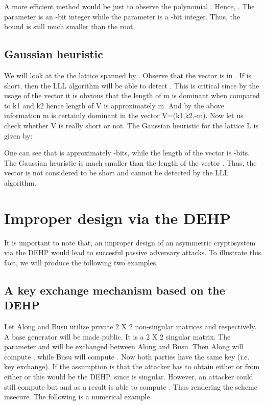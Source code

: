 \documentclass{llncs}
\begin{document}
\begin{case}
A more efficient method would be just to observe the polynomial
. Hence, . The parameter  is an -bit
integer while the parameter  is a -bit integer. Thus,
the bound is still much smaller than the root.
\end{case}

\subsection{Gaussian heuristic}
We will look at the the lattice  spanned by . Observe that the vector  is
in . If  is short, then the LLL algorithm will be able to
detect . This is critical since by the usage of the vector
 it is obvious that the length of m is dominant when
compared to k1 and k2 hence length of V is approximately m. And by
the above information m is certainly dominant in the vector
V=(k1,k2,-m). Now let us check whether V is really short or not.
The Gaussian heuristic for the lattice L is given by:

One can see that  is approximately -bits,
while the length of the vector  is -bits. The
Gaussian heuristic is much smaller than the length of the vector .
Thus, the vector  is not considered to be short and cannot be detected
by the LLL algorithm.

\section{Improper design via the DEHP}
It is important to note that, an improper design of an asymmetric
cryptosystem via the DEHP would lead to succesful passive
adversary attacks. To illustrate this fact, we will produce the
following two examples.

\subsection{A key exchange mechanism based on the DEHP}
Let Along and Busu utilize private 2 X 2 non-singular matrices
 and  respectively. A base generator
 will be made public. It is a 2 X 2 singular matrix.
The parameter  and
 will be exchanged between Along and
Busu. Then Along will compute
, while Busu will compute
. Now both parties have
the same key (i.e. key exchange). If the assumption is that the
attacker has to obtain either  or  from
either  or  this would be the
DEHP, since  is singular. However, an attacker could
still compute  but
 and as a result is able to
compute . Thus
rendering the scheme insecure. The following is a numerical
example.
\end{document}
